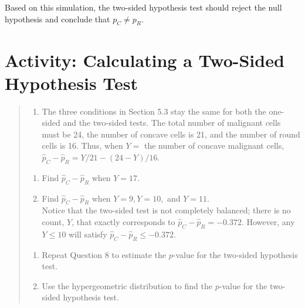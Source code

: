 \documentclass[
]{report}
\providecommand{\tightlist}{%
  \setlength{\itemsep}{0pt}\setlength{\parskip}{0pt}}
\begin{document}
Based on this simulation, the two-sided hypothesis test should reject the null hypothesis and conclude that \(p_C \neq p_R\).

\hypertarget{activity-calculating-a-two-sided-hypothesis-test}{%
\section*{Activity: Calculating a Two-Sided Hypothesis Test}\label{activity-calculating-a-two-sided-hypothesis-test}}

\begin{quote}
\begin{enumerate}
\def\labelenumi{\arabic{enumi}.}
\setcounter{enumi}{13}
\tightlist
\item
  The three conditions in Section 5.3 stay the same for both the one-sided and the two-sided tests. The total number of malignant cells must be 24, the number of concave cells is 21, and the number of round cells is 16. Thus, when \(Y =\) the number of concave malignant cells, \(\hat p_C - \hat p_R = Y/21 - (24 - Y)/16\).\\
\end{enumerate}

\begin{enumerate}
\def\labelenumi{\alph{enumi}.}
\tightlist
\item
  Find \(\hat p_C - \hat p_R\) when \(Y = 17\).\\
\item
  Find \(\hat p_C - \hat p_R\) when \(Y = 9, Y = 10,\) and \(Y = 11\).\\
  Notice that the two-sided test is not completely balanced; there is no count, \(Y\), that exactly corresponds to \(\hat p_C - \hat p_R = -0.372\). However, any \(Y \le 10\) will satisfy \(\hat p_C - \hat p_R \le -0.372\).\\
\end{enumerate}

\begin{enumerate}
\def\labelenumi{\arabic{enumi}.}
\setcounter{enumi}{14}
\tightlist
\item
  Repeat Question 8 to estimate the \(p\)-value for the two-sided hypothesis test.\\
\item
  Use the hypergeometric distribution to find the \(p\)-value for the two-sided hypothesis test.
\end{enumerate}
\end{quote}
\end{document}
